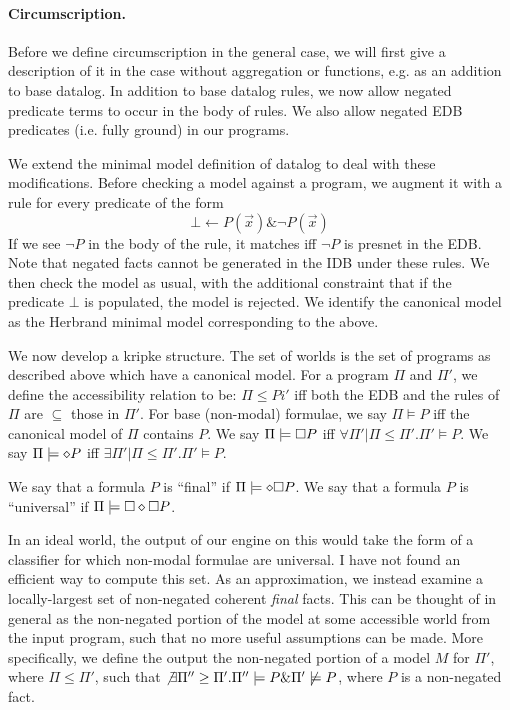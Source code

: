 \paragraph{Circumscription.}
Before we define circumscription in the general case, we will first give a description of it in the case without aggregation or functions, e.g. as an addition to base datalog.
In addition to base datalog rules, we now allow negated predicate terms to occur in the body of rules.
We also allow negated EDB predicates (i.e. fully ground) in our programs.

We extend the minimal model definition of datalog to deal with these modifications.
Before checking a model against a program, we augment it with a rule for every predicate of the form
\[
	\bot \leftarrow P(\vec{x}) \& \neg P(\vec{x})
\]
If we see $\neg P$ in the body of the rule, it matches iff $\neg P$ is presnet in the EDB.
Note that negated facts cannot be generated in the IDB under these rules.
We then check the model as usual, with the additional constraint that if the predicate $\bot$ is populated, the model is rejected.
We identify the canonical model as the Herbrand minimal model corresponding to the above.

We now develop a kripke structure.
The set of worlds is the set of programs as described above which have a canonical model.
For a program $\Pi$ and $\Pi'$, we define the accessibility relation to be: $\Pi \leq Pi'$ iff both the EDB and the rules of $\Pi$ are $\subseteq$ those in $\Pi'$.
For base (non-modal) formulae, we say $\Pi \models P$ iff the canonical model of $\Pi$ contains $P$.
We say $\Pi \models \square P$ iff $\forall \Pi' | \Pi \leq \Pi'. \Pi' \models P$.
We say $\Pi \models \diamond P$ iff $\exists \Pi' | \Pi \leq \Pi'. \Pi' \models P$.

We say that a formula $P$ is ``final'' if $\Pi \models \diamond \square P$.
We say that a formula $P$ is ``universal'' if $\Pi \models \square \diamond \square P$.

In an ideal world, the output of our engine on this would take the form of a classifier for which non-modal formulae are universal.
I have not found an efficient way to compute this set.
As an approximation, we instead examine a locally-largest set of non-negated coherent \emph{final} facts.
This can be thought of in general as the non-negated portion of the model at some accessible world from the input program, such that no more useful assumptions can be made.
More specifically, we define the output the non-negated portion of a model $M$ for $\Pi'$, where $\Pi \leq \Pi'$, such that $\not \exists \Pi'' \geq \Pi'. \Pi'' \models P \& \Pi' \not \models P$, where $P$ is a non-negated fact.


